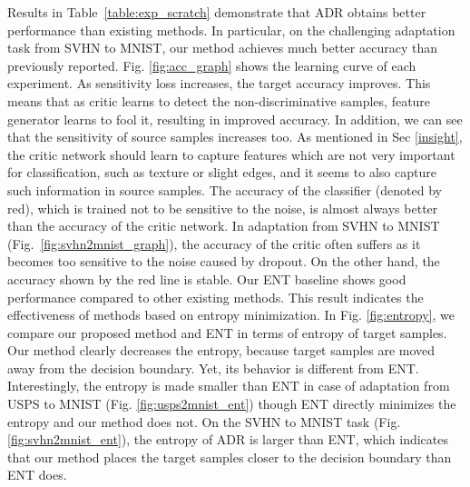 \documentclass{article} \usepackage{iclr2018_conference,times}
\begin{document}
Results in Table~\ref{table:exp_scratch} demonstrate that ADR obtains better performance than existing methods. In particular, on the challenging adaptation task from SVHN to MNIST, our method achieves much better accuracy than previously reported. Fig. \ref{fig:acc_graph} shows the learning curve of each experiment. As sensitivity loss increases, the target accuracy improves. This means that as critic  learns to detect the non-discriminative samples, feature generator  learns to fool it, resulting in improved accuracy.
In addition, we can see that the sensitivity of source samples increases too. As mentioned in Sec \ref{insight}, the critic network should learn to capture features which are not very important for classification, such as texture or slight edges, and it seems to also capture such information in source samples.
The accuracy of the classifier  (denoted by red), which is trained not to be sensitive to the noise, is almost always better than the accuracy of the critic network. In adaptation from SVHN to MNIST (Fig.~\ref{fig:svhn2mnist_graph}), the accuracy of the critic often suffers as it becomes too sensitive to the noise caused by dropout. On the other hand, the accuracy shown by the red line is stable. Our ENT baseline shows good performance compared to other existing methods. This result indicates the effectiveness of methods based on entropy minimization. In Fig. \ref{fig:entropy}, we compare our proposed method and ENT in terms of entropy of target samples. Our method clearly decreases the entropy, because target samples are moved away from the decision boundary. Yet, its behavior is different from ENT. 
Interestingly, the entropy is made smaller than ENT in case of adaptation from USPS to MNIST (Fig. \ref{fig:usps2mnist_ent}) though ENT directly minimizes the entropy and our method does not. On the SVHN to MNIST task (Fig. \ref{fig:svhn2mnist_ent}), the entropy of ADR is larger than ENT, which indicates that our method places the target samples closer to the decision boundary than ENT does. 
\end{document}
